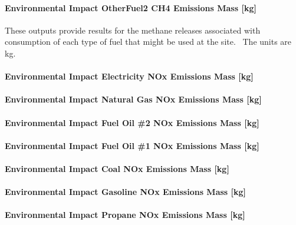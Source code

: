 \paragraph{Environmental Impact OtherFuel2 CH4 Emissions Mass {[}kg{]}}\label{environmental-impact-otherfuel2-ch4-emissions-mass-kg}

These outputs provide results for the methane releases associated with consumption of each type of fuel that might be used at the site.~ The units are kg.

\paragraph{Environmental Impact Electricity NOx Emissions Mass {[}kg{]}}\label{environmental-impact-electricity-nox-emissions-mass-kg}

\paragraph{Environmental Impact Natural Gas NOx Emissions Mass {[}kg{]}}\label{environmental-impact-natural-gas-nox-emissions-mass-kg}

\paragraph{Environmental Impact Fuel Oil \#2 NOx Emissions Mass {[}kg{]}}\label{environmental-impact-fuel-oil-2-nox-emissions-mass-kg}

\paragraph{Environmental Impact Fuel Oil \#1 NOx Emissions Mass {[}kg{]}}\label{environmental-impact-fuel-oil-1-nox-emissions-mass-kg}

\paragraph{Environmental Impact Coal NOx Emissions Mass {[}kg{]}}\label{environmental-impact-coal-nox-emissions-mass-kg}

\paragraph{Environmental Impact Gasoline NOx Emissions Mass {[}kg{]}}\label{environmental-impact-gasoline-nox-emissions-mass-kg}

\paragraph{Environmental Impact Propane NOx Emissions Mass {[}kg{]}}\label{environmental-impact-propane-nox-emissions-mass-kg}

